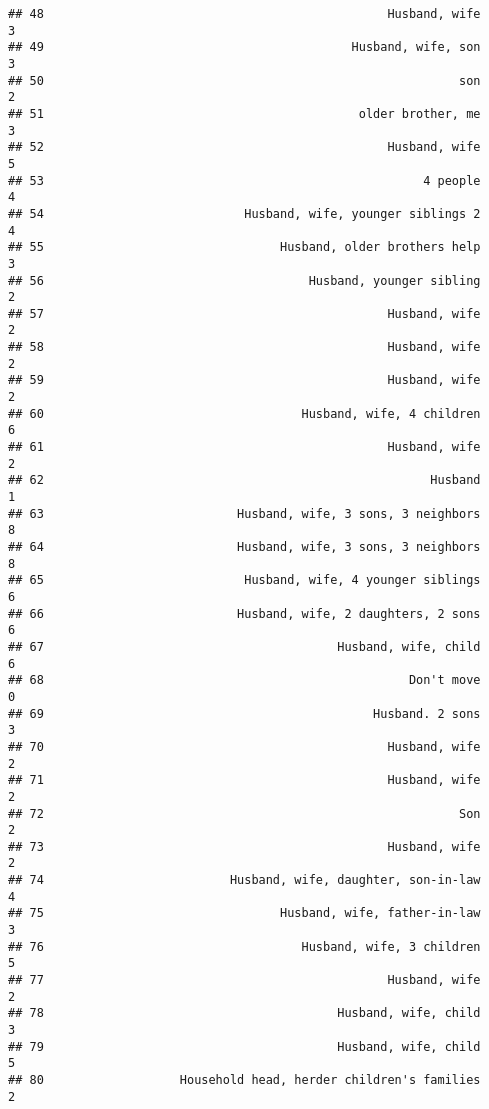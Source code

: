 \documentclass[
]{article}
\begin{document}
\begin{verbatim}
## 48                                                Husband, wife             3
## 49                                           Husband, wife, son             3
## 50                                                          son             2
## 51                                            older brother, me             3
## 52                                                Husband, wife             5
## 53                                                     4 people             4
## 54                            Husband, wife, younger siblings 2             4
## 55                                 Husband, older brothers help             3
## 56                                     Husband, younger sibling             2
## 57                                                Husband, wife             2
## 58                                                Husband, wife             2
## 59                                                Husband, wife             2
## 60                                    Husband, wife, 4 children             6
## 61                                                Husband, wife             2
## 62                                                      Husband             1
## 63                           Husband, wife, 3 sons, 3 neighbors             8
## 64                           Husband, wife, 3 sons, 3 neighbors             8
## 65                            Husband, wife, 4 younger siblings             6
## 66                           Husband, wife, 2 daughters, 2 sons             6
## 67                                         Husband, wife, child             6
## 68                                                   Don't move             0
## 69                                              Husband. 2 sons             3
## 70                                                Husband, wife             2
## 71                                                Husband, wife             2
## 72                                                          Son             2
## 73                                                Husband, wife             2
## 74                          Husband, wife, daughter, son-in-law             4
## 75                                 Husband, wife, father-in-law             3
## 76                                    Husband, wife, 3 children             5
## 77                                                Husband, wife             2
## 78                                         Husband, wife, child             3
## 79                                         Husband, wife, child             5
## 80                   Household head, herder children's families             2

\end{verbatim}
\end{document}
